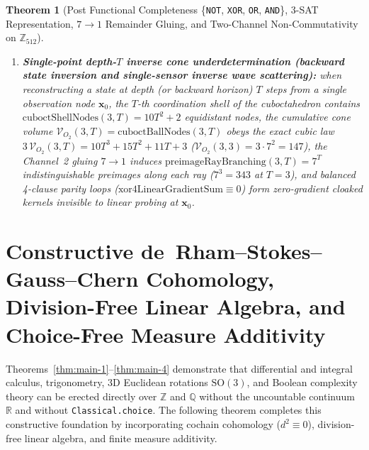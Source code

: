 \documentclass[11pt,a4paper]{article}
\theoremstyle{plain}
\newtheorem{theorem}{Theorem}[section]
\theoremstyle{definition}
\begin{document}
\begin{theorem}[Post Functional Completeness \{\texttt{NOT}, \texttt{XOR}, \texttt{OR}, \texttt{AND}\}, 3-SAT Representation, $7\to 1$ Remainder Gluing, and Two-Channel Non-Commutativity on $\mathbb{Z}_{512}$]
\begin{enumerate}[label=\textbf{(\roman*)},leftmargin=*]
\item \textbf{Single-point depth-$T$ inverse cone underdetermination (backward state inversion and single-sensor inverse wave scattering):}
  when reconstructing a state at depth (or backward horizon) $T$ steps from a single observation node $\mathbf{x}_0$, the $T$-th coordination shell of the cuboctahedron contains $\mathrm{cuboctShellNodes}(3,T)=10T^2+2$ equidistant nodes, the cumulative cone volume $\mathcal{V}_{O_2}(3,T)=\mathrm{cuboctBallNodes}(3,T)$ obeys the exact cubic law $3\,\mathcal{V}_{O_2}(3,T)=10T^3+15T^2+11T+3$ ($\mathcal{V}_{O_2}(3,3)=3\cdot 7^2=147$), the Channel~2 gluing $7\to 1$ induces $\mathrm{preimageRayBranching}(3,T)=7^T$ indistinguishable preimages along each ray ($7^3=343$ at $T=3$), and balanced 4-clause parity loops ($\mathrm{xor4LinearGradientSum}\equiv 0$) form zero-gradient cloaked kernels invisible to linear probing at $\mathbf{x}_0$.
\end{enumerate}
\end{theorem}

\section{Constructive de~Rham--Stokes--Gauss--Chern Cohomology, Division-Free Linear Algebra, and Choice-Free Measure Additivity}
\label{sec:constructive-foundations}

Theorems~\ref{thm:main-1}--\ref{thm:main-4} demonstrate that differential and integral calculus, trigonometry, 3D Euclidean rotations $\mathrm{SO}(3)$, and Boolean complexity theory can be erected directly over $\mathbb{Z}$ and $\mathbb{Q}$ without the uncountable continuum~$\mathbb{R}$ and without \texttt{Classical.choice}. The following theorem completes this constructive foundation by incorporating cochain cohomology ($d^2\equiv 0$), division-free linear algebra, and finite measure additivity.
\end{document}
